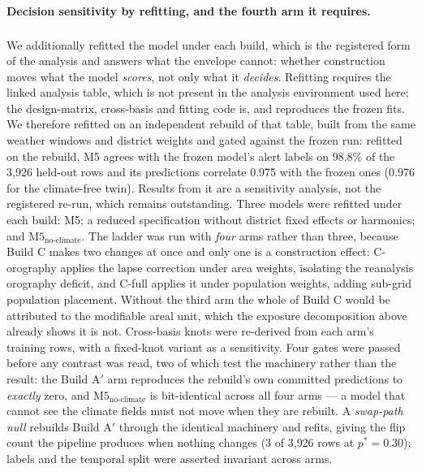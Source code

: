 \documentclass[11pt,a4paper]{article}
\providecommand{\REBUILD}{\textsuperscript{\ddag}}
\begin{document}
\paragraph{Decision sensitivity by refitting, and the fourth arm it requires.}\REBUILD{} We additionally refitted the model under each build, which is the registered form of the analysis and answers what the envelope cannot: whether construction moves what the model \emph{scores}, not only what it \emph{decides}. Refitting requires the linked analysis table, which is not present in the analysis environment used here; the design-matrix, cross-basis and fitting code is, and reproduces the frozen fits. We therefore refitted on an independent rebuild of that table, built from the same weather windows and district weights and gated against the frozen run: refitted on the rebuild, M5 agrees with the frozen model's alert labels on 98.8\% of the 3{,}926 held-out rows and its predictions correlate 0.975 with the frozen ones (0.976 for the climate-free twin).\label{par:rebuild} Results from it are a sensitivity analysis, not the registered re-run, which remains outstanding. Three models were refitted under each build: M5; a reduced specification without district fixed effects or harmonics; and $\text{M5}_{\text{no-climate}}$. The ladder was run with \emph{four} arms rather than three, because Build C makes two changes at once and only one is a construction effect: C-orography applies the lapse correction under area weights, isolating the reanalysis orography deficit, and C-full applies it under population weights, adding sub-grid population placement. Without the third arm the whole of Build C would be attributed to the modifiable areal unit, which the exposure decomposition above already shows it is not. Cross-basis knots were re-derived from each arm's training rows, with a fixed-knot variant as a sensitivity. Four gates were passed before any contrast was read, two of which test the machinery rather than the result: the Build A$'$ arm reproduces the rebuild's own committed predictions to \emph{exactly} zero, and $\text{M5}_{\text{no-climate}}$ is bit-identical across all four arms --- a model that cannot see the climate fields must not move when they are rebuilt. A \emph{swap-path null} rebuilds Build A$'$ through the identical machinery and refits, giving the flip count the pipeline produces when nothing changes (3 of 3{,}926 rows at $p^*=0.30$); labels and the temporal split were asserted invariant across arms.
\end{document}
